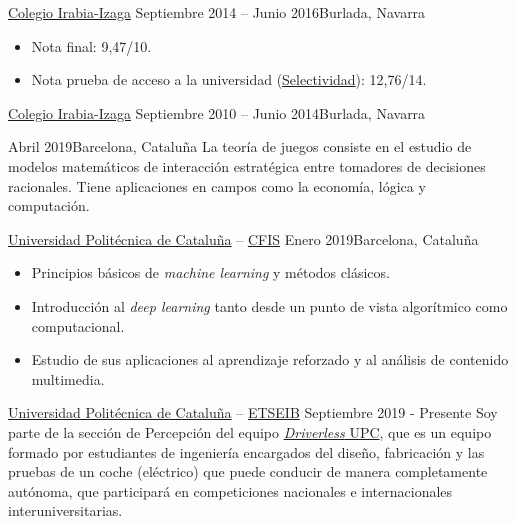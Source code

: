 \documentclass[10pt, a4paper, ragged2e]{altacv}
\begin{document}
\divider

{\href{https://www.irabia-izaga.org}{Colegio Irabia-Izaga}}
{Septiembre 2014 -- Junio 2016}{Burlada, Navarra}
\begin{itemize}
  \item Nota final: 9,47/10.
  \item Nota prueba de acceso a la universidad
  (\href{https://es.wikipedia.org/wiki/Selectividad_(examen)}{Selectividad}):
  12,76/14.
\end{itemize}

\divider

{\href{https://www.irabia-izaga.org}{Colegio Irabia-Izaga}}
{Septiembre 2010 -- Junio 2014}{Burlada, Navarra}

\medskip
{}

{Abril 2019}{Barcelona, Cataluña}
La teoría de juegos consiste en el estudio de modelos matemáticos de interacción
estratégica entre tomadores de decisiones racionales. Tiene aplicaciones en
campos como la economía, lógica y computación.

\vspace{.1cm}
\divider
\vspace{.15cm}

{\href{https://upc.edu}{Universidad Politécnica de Cataluña} --
  \href{https://cfis.upc.edu}{CFIS}}
{Enero 2019}{Barcelona, Cataluña}
\begin{itemize}
  \item Principios básicos de \textit{machine learning} y métodos clásicos.
  \item Introducción al \textit{deep learning} tanto desde un punto de vista
  algorítmico como computacional.
  \item Estudio de sus aplicaciones al aprendizaje reforzado y al análisis de
  contenido multimedia.
\end{itemize}


\clearpage


{\href{https://upc.edu}{Universidad Politécnica de Cataluña} --
\href{https://etseib.upc.edu}{ETSEIB}}
{Septiembre 2019 - Presente}{}
Soy parte de la sección de Percepción del equipo
\href{https://driverless.upc.edu}{\textit{Driverless} UPC}, que es un equipo
formado por estudiantes de ingeniería encargados del diseño, fabricación y las
pruebas de un coche (eléctrico) que puede conducir de manera completamente
autónoma, que participará en competiciones nacionales e internacionales
interuniversitarias.
\end{document}
